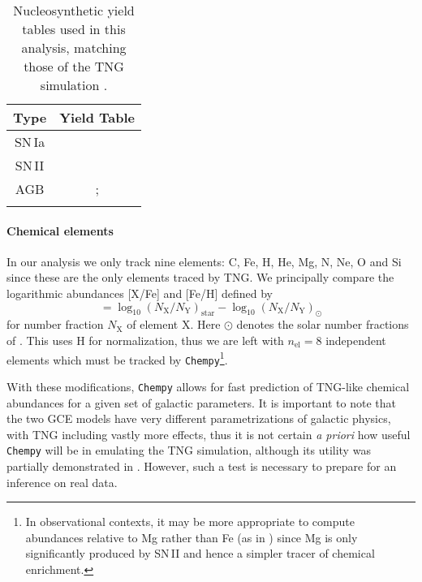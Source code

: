 \documentclass{aa}
\begin{document}
\begin{table}[]
\caption{Nucleosynthetic yield tables used in this analysis, matching those of the TNG simulation \citep[Tab.\,2]{2018MNRAS.473.4077P}.}
     \centering
     \begin{tabular}{c|c}
       Type & Yield Table \\
        \hline
         SN\,Ia & \citet{1997NuPhA.621..467N}\\
         SN\,II & \citet{2006ApJ...653.1145K,portinari}\\
         AGB & \citet{2010MNRAS.403.1413K,2014MNRAS.437..195D};\\
         & \citet{2014ApJ...797...44F}
     \end{tabular}
 \label{tab:chempy_TNG_yields}
 \end{table}


\paragraph{Chemical elements}
In our analysis we only track nine elements: C, Fe, H, He, Mg, N, Ne, O and Si since these are the only elements traced by TNG. We principally compare the logarithmic abundances [X/Fe] and [Fe/H] defined by 
\begin{equation}
     [\mathrm{X}/\mathrm{Y}] = \log_{10}(N_\mathrm X/N_\mathrm Y)_\mathrm{star} - \log_{10}(N_\mathrm X/N_\mathrm Y)_\odot
\end{equation}
for number fraction $N_\mathrm X$ of element X. Here $\odot$ denotes the solar number fractions of \citet{2009ARA&A..47..481A}. This uses H for normalization, thus we are left with $n_\mathrm{el}=8$ independent elements which must be tracked by \texttt{Chempy}\footnote{In observational contexts, it may be more appropriate to compute abundances relative to Mg rather than Fe (as in \citep{2019ApJ...874..102W}) since Mg is only significantly produced by SN\,II and hence a simpler tracer of chemical enrichment.}. 

With these modifications, \texttt{Chempy} allows for fast prediction of TNG-like chemical abundances for a given set of galactic parameters. It is important to note that the two GCE models have very different parametrizations of galactic physics, with TNG including vastly more effects, thus it is not certain \textit{a priori} how useful \texttt{Chempy} will be in emulating the TNG simulation, although its utility was partially demonstrated in \citet{2018ApJ...861...40P}. However,  such a test is necessary to prepare for an inference on real data.
\end{document}
